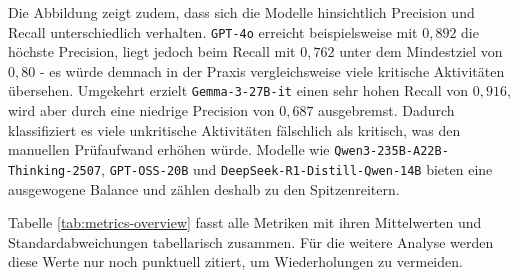 Die Abbildung zeigt zudem, dass sich die Modelle hinsichtlich Precision und Recall unterschiedlich verhalten. \texttt{GPT-4o} erreicht beispielsweise mit $0{,}892$ die höchste Precision, liegt jedoch beim Recall mit $0{,}762$ unter dem Mindestziel von $0{,}80$ - es würde demnach in der Praxis vergleichsweise viele kritische Aktivitäten übersehen. Umgekehrt erzielt \texttt{Gemma-3-27B-it} einen sehr hohen Recall von $0{,}916$, wird aber durch eine niedrige Precision von $0{,}687$ ausgebremst. Dadurch klassifiziert es viele unkritische Aktivitäten fälschlich als kritisch, was den manuellen Prüfaufwand erhöhen würde. Modelle wie \texttt{Qwen3-235B-A22B-Thinking-2507}, \texttt{GPT-OSS-20B} und \texttt{DeepSeek-R1-Distill-Qwen-14B} bieten eine ausgewogene Balance und zählen deshalb zu den Spitzenreitern.

Tabelle \ref{tab:metrics-overview} fasst alle Metriken mit ihren Mittelwerten und Standardabweichungen tabellarisch zusammen. Für die weitere Analyse werden diese Werte nur noch punktuell zitiert, um Wiederholungen zu vermeiden.

